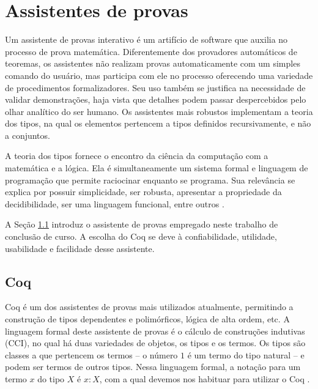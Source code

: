 \chapter{Assistentes de provas}
\label{cap:provas}

Um assistente de provas interativo é um artifício de software que auxilia no processo de prova matemática. Diferentemente dos provadores automáticos de teoremas, os assistentes não realizam provas automaticamente com um simples comando do usuário, mas participa com ele no processo oferecendo uma variedade de procedimentos formalizadores. Seu uso também se justifica na necessidade de validar demonstrações, haja vista que detalhes podem passar despercebidos pelo olhar analítico do ser humano. Os assistentes mais robustos implementam a teoria dos tipos, na qual os elementos pertencem a tipos definidos recursivamente, e não a conjuntos.

A teoria dos tipos fornece o encontro da ciência da computação com a matemática e a lógica. Ela é simultaneamente um sistema formal e linguagem de programação que permite raciocinar enquanto se programa. Sua relevância se explica por possuir simplicidade, ser robusta, apresentar a propriedade da decidibilidade, ser uma linguagem funcional, entre outros \cite{luo}.

A Seção \ref{sec:coq} introduz o assistente de provas empregado neste trabalho de conclusão de curso. A escolha do Coq se deve à confiabilidade, utilidade, usabilidade e facilidade desse assistente.

\section{Coq}
\label{sec:coq}

Coq é um dos assistentes de provas mais utilizados atualmente, permitindo a construção de tipos dependentes e polimórficos, lógica de alta ordem, etc. A linguagem formal deste assistente de provas é o cálculo de construções indutivas (\acs{CCI}), no qual há duas variedades de objetos, os tipos e os termos. Os tipos são classes a que pertencem os termos -- o número $1$ é um termo do tipo natural -- e podem ser termos de outros tipos. Nessa linguagem formal, a notação para um termo $x$ do tipo $X$ é $x:X$, com a qual devemos nos habituar para utilizar o Coq \cite{manualcoq}.

